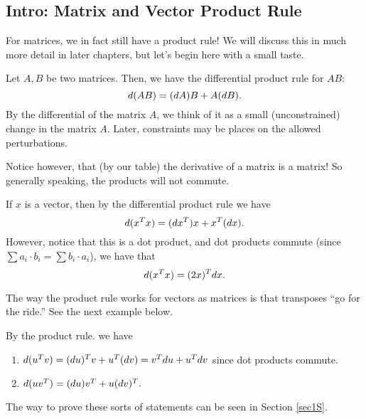 \subsection{Intro: Matrix and Vector Product Rule}

For matrices, we in fact still have a product rule!  We will discuss this in much more detail in later chapters, but let's begin here with a small taste.

\begin{theorem}
Let $A,B$ be two matrices. Then, we have the differential product rule for $AB$:
\[
d(AB) = (d A)B + A(d B).
\]
By the differential of the matrix $A$, we think of it as a small (unconstrained) change in the matrix $A.$ Later, constraints may be places on the allowed perturbations.
\end{theorem}
Notice however, that (by our table) the derivative of a matrix is a matrix! So generally speaking, the products will not commute.

If $x$ is a vector, then by the differential product rule we have
\[
d(x^Tx) = (d x^T)x + x^T (d x).
\]
However, notice that this is a dot product, and dot products commute (since $\sum a_i \cdot b_i = \sum b_i \cdot a_i$), we have that 
\[
d(x^T x) = (2x)^T d x.
\]

\begin{remark}
The way the product rule works for vectors as matrices is that transposes ``go for the ride.'' See the next example below.
\end{remark}

\begin{example}
    By the product rule. we have 
    \begin{enumerate}
        \item $d(u^Tv) = (d u)^T v + u^T (d v) = v^T d u + u^T d v$ since dot products commute.
        \item $d(uv^T) = (d u )v^T + u( d v)^T.$
    \end{enumerate}
\end{example} %

\begin{remark}
    The way to prove these sorts of statements can be seen in Section \ref{sec1S}.
\end{remark}


